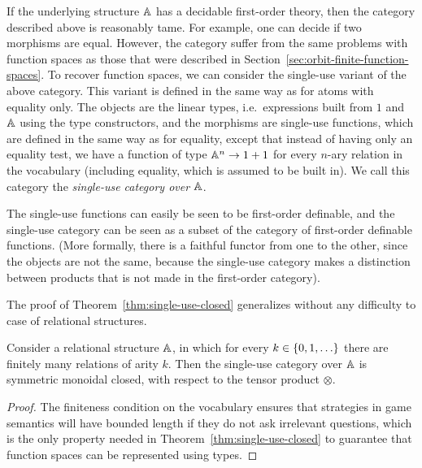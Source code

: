 If the underlying structure $\mathbb A$ has a decidable first-order theory, then the category described above is reasonably tame. For example, one can decide if two morphisms are equal. However, the category suffer from the same problems with function spaces as those that were described in Section~\ref{sec:orbit-finite-function-spaces}. 
To recover function spaces, we can consider the single-use variant of the above category. This variant is defined in the same way as for atoms with equality only. The objects are the linear types, i.e.~expressions built from $1$ and $\mathbb A$ using the type constructors, and the morphisms are single-use functions, which are defined in the same way as for equality, except that instead of having only an equality test, we have a function of type $\mathbb A^n \to 1+1$ for every $n$-ary relation in the vocabulary (including equality, which is assumed to be built in). We call this category the \emph{single-use category over $\mathbb A$}. 

The single-use functions can easily be seen to be first-order definable, and the single-use category can be seen as a subset of the category of first-order definable functions. (More formally, there is a faithful functor from one to the other, since the objects are not the same, because the single-use category makes a distinction between products that is not made in the first-order category). 

The proof of Theorem~\ref{thm:single-use-closed} generalizes without any difficulty to case of relational structures. 

\begin{theorem}\label{thm:single-use-closed-relational-structures}
    Consider a relational structure $\mathbb A$, in which for every $k \in \{0,1,\ldots\}$ there are finitely many relations of arity $k$. Then the single-use category over $\mathbb A$ is symmetric monoidal closed, with respect to the tensor product $\otimes$.
\end{theorem}
\begin{proof}
    The finiteness condition on the vocabulary  ensures that strategies in game semantics will have bounded length if they do not ask irrelevant questions, which is the only property needed in Theorem~\ref{thm:single-use-closed} to guarantee that function spaces can be represented using types. 
\end{proof}

